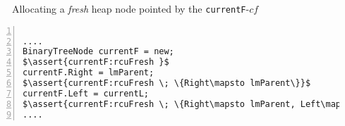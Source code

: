 \begin{figure}[H]
 \caption{Allocating a \textit{fresh} heap node pointed by the \texttt{currentF}-$cf$}
 \label{fig:alloc}
 \end{figure}
\begin{lstlisting}[caption={Allocating a fresh node},label={lst:alloc}, numbers=left, numberstyle=\tiny\color{red}, numbersep=5pt]%, basicstyle=\scriptsize]

....
BinaryTreeNode currentF = new;
$\assert{currentF:rcuFresh }$
currentF.Right = lmParent;
$\assert{currentF:rcuFresh \; \{Right\mapsto lmParent\}}$
currentF.Left = currentL;
$\assert{currentF:rcuFresh \; \{Right\mapsto lmParent, Left\mapsto currentL\}}$
....
\end{lstlisting}

